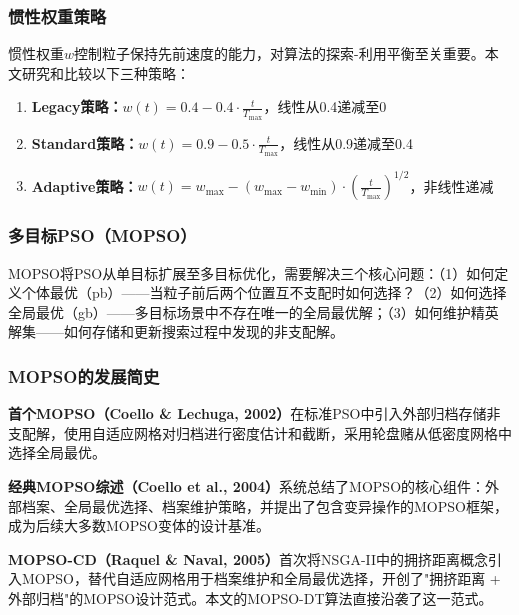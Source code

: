 \subsubsection{惯性权重策略}

惯性权重$w$控制粒子保持先前速度的能力，对算法的探索-利用平衡至关重要。本文研究和比较以下三种策略：

\begin{enumerate}
    \item \textbf{Legacy策略：}$w(t) = 0.4 - 0.4 \cdot \frac{t}{T_{\max}}$，线性从0.4递减至0
    \item \textbf{Standard策略：}$w(t) = 0.9 - 0.5 \cdot \frac{t}{T_{\max}}$，线性从0.9递减至0.4~\cite{Shi1998}
    \item \textbf{Adaptive策略：}$w(t) = w_{\max} - (w_{\max} - w_{\min}) \cdot \left(\frac{t}{T_{\max}}\right)^{1/2}$，非线性递减
\end{enumerate}

\subsubsection{多目标PSO（MOPSO）}

MOPSO将PSO从单目标扩展至多目标优化，需要解决三个核心问题：（1）如何定义个体最优（pb）——当粒子前后两个位置互不支配时如何选择？（2）如何选择全局最优（gb）——多目标场景中不存在唯一的全局最优解；（3）如何维护精英解集——如何存储和更新搜索过程中发现的非支配解。

\subsubsection{MOPSO的发展简史}

\textbf{首个MOPSO（Coello \& Lechuga, 2002）}在标准PSO中引入外部归档存储非支配解，使用自适应网格对归档进行密度估计和截断，采用轮盘赌从低密度网格中选择全局最优。

\textbf{经典MOPSO综述（Coello et al., 2004）}\cite{Coello2004}系统总结了MOPSO的核心组件：外部档案、全局最优选择、档案维护策略，并提出了包含变异操作的MOPSO框架，成为后续大多数MOPSO变体的设计基准。

\textbf{MOPSO-CD（Raquel \& Naval, 2005）}\cite{Raquel2005}首次将NSGA-II中的拥挤距离概念引入MOPSO，替代自适应网格用于档案维护和全局最优选择，开创了"拥挤距离 + 外部归档"的MOPSO设计范式。本文的MOPSO-DT算法直接沿袭了这一范式。

